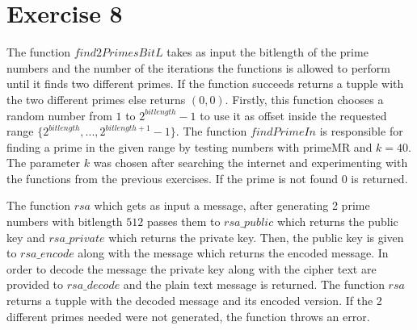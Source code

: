 \documentclass{article}
\begin{document}
\section*{Exercise 8}
The function $find2PrimesBitL$ takes as input the bitlength of the prime numbers and the number of the iterations the functions is allowed to perform until it finds two different primes. If the function succeeds returns a tupple with the two different primes else returns $(0,0)$. Firstly, this function chooses a random number from $1$ to $2^{bitlength}-1$ to use it as offset inside the requested range $\{2^{bitlength},...,2^{bitlength+1}-1\}$. The function $findPrimeIn$ is  responsible for finding a prime in the given range by testing numbers with primeMR and $k = 40$. The parameter $k$ was chosen after searching the internet and experimenting with the functions from the previous exercises. If the prime is not found 0 is returned. 


The function $rsa$ which gets as input a message, after  generating 2 prime numbers with bitlength $512$ passes them to $rsa\_public$ which returns the public key and $rsa\_private$ which returns the private key. Then, the public key is given to $rsa\_encode$ along with the message which returns the encoded message. In order to decode the message the private key along with the cipher text are provided to $rsa\_decode$ and the plain text message is returned. The function  $rsa$ returns a tupple with the decoded message and its encoded version. If the 2 different primes needed were not generated, the function throws an error.


\end{document}
